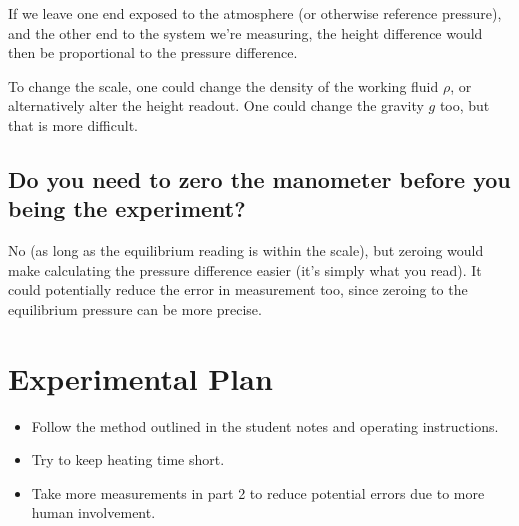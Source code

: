 \documentclass[a4paper]{scrartcl}
\begin{document}
If we leave one end exposed to the atmosphere (or otherwise reference pressure), and the other end to the system we're measuring, the height difference would then be proportional to the pressure difference.

To change the scale, one could change the density of the working fluid \(\rho\), or alternatively alter the height readout. One could change the gravity \(g\) too, but that is more difficult.

\subsection{Do you need to zero the manometer before you being the experiment?}
No (as long as the equilibrium reading is within the scale), but zeroing would make calculating the pressure difference easier (it's simply what you read). It could potentially reduce the error in measurement too, since zeroing to the equilibrium pressure can be more precise.

\section{Experimental Plan}
\begin{itemize}
    \item Follow the method outlined in the student notes and operating instructions.
    \item Try to keep heating time short.
    \item Take more measurements in part 2 to reduce potential errors due to more human involvement.
\end{itemize}
\end{document}
